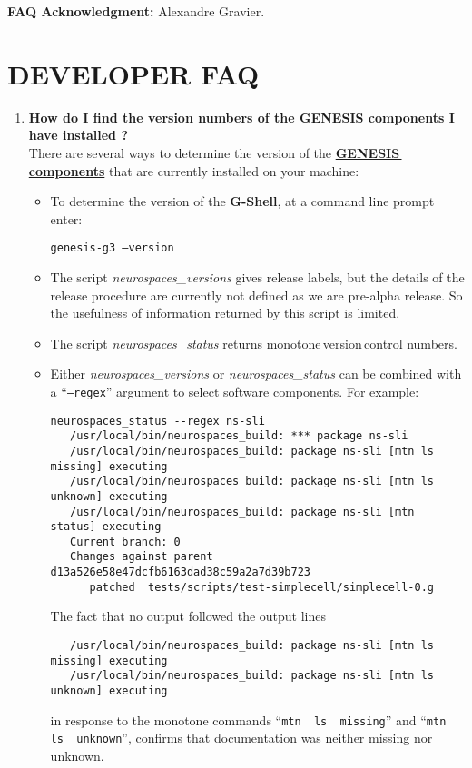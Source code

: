 \documentclass[12pt]{article}
\begin{document}
{\bf FAQ Acknowledgment:} Alexandre Gravier.

\section*{DEVELOPER FAQ}

\begin{enumerate}

\item {\bf How do I find the version numbers of the GENESIS components I have installed ?} \\
There are several ways to determine the version of the \href{../reserved-words/reserved-words.tex}{\bf GENESIS\,components} that are currently installed on your machine:
\begin{itemize}
\item To determine the version of the {\bf G-Shell}, at a command line prompt enter:

{\tt genesis-g3 --version}

\item The script {\it neurospaces\_versions} gives release labels, but the details
of the release procedure are currently not defined as we are pre-alpha release.  So the usefulness of information returned by this script is limited.

\item The script {\it neurospaces\_status} returns \href{../version-control/version-control.tex}{monotone\,version\,control} numbers.

\item Either {\it neurospaces\_versions} or {\it neurospaces\_status} can be combined with a ``{\tt --regex}'' argument to select
software components.  For example:

\begin{verbatim}
neurospaces_status --regex ns-sli
   /usr/local/bin/neurospaces_build: *** package ns-sli
   /usr/local/bin/neurospaces_build: package ns-sli [mtn ls missing] executing
   /usr/local/bin/neurospaces_build: package ns-sli [mtn ls unknown] executing
   /usr/local/bin/neurospaces_build: package ns-sli [mtn status] executing
   Current branch: 0
   Changes against parent d13a526e58e47dcfb6163dad38c59a2a7d39b723
      patched  tests/scripts/test-simplecell/simplecell-0.g
\end{verbatim}

The fact that no output followed the output lines
\begin{verbatim}
   /usr/local/bin/neurospaces_build: package ns-sli [mtn ls missing] executing
   /usr/local/bin/neurospaces_build: package ns-sli [mtn ls unknown] executing
\end{verbatim}
in response to the monotone commands ``{\tt mtn\,\,ls\,\,missing}'' and ``{\tt mtn\,\,ls\,\,unknown}'', confirms that documentation was neither missing nor unknown.


\end{itemize}
\end{enumerate}
\end{document}
